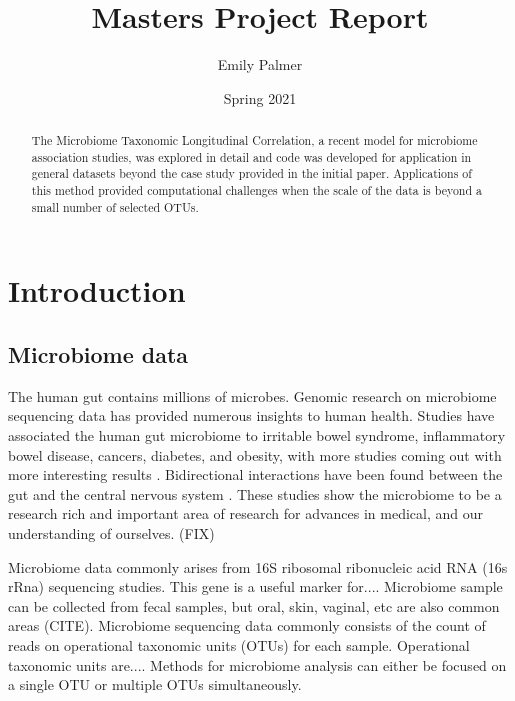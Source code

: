 \documentclass[12pt]{article}
\title{Masters Project Report}
\author{Emily Palmer}
\date{Spring 2021}
\begin{document}
\maketitle

\begin{abstract}
  The Microbiome Taxonomic Longitudinal Correlation, a recent model for microbiome association studies, was explored in detail and code was developed for application in general datasets beyond the case study provided in the initial paper. Applications of this method provided computational challenges when the scale of the data is beyond a small number of selected OTUs.
\end{abstract}

\tableofcontents



\section{Introduction}

\subsection{Microbiome data}
The human gut contains millions of microbes. Genomic research on microbiome sequencing data has provided numerous insights to human health. Studies have associated the human gut microbiome to irritable bowel syndrome, inflammatory bowel disease, cancers, diabetes, and obesity, with more studies coming out with more interesting results \cite{kinross2008human}. Bidirectional interactions have been found between the gut and the central nervous system \cite{mayer2015gut}. These studies show the microbiome to be a research rich and important area of research for advances in medical, and our understanding of ourselves. (FIX)

Microbiome data commonly arises from 16S ribosomal ribonucleic acid RNA (16s rRna) sequencing studies. This gene is a useful marker for.... Microbiome sample can be collected from fecal samples, but oral, skin, vaginal, etc are also common areas (CITE). Microbiome sequencing data commonly consists of the count of reads on operational taxonomic units (OTUs) for each sample. Operational taxonomic units are.... Methods for microbiome analysis can either be focused on a single OTU or multiple OTUs simultaneously.
\end{document}
